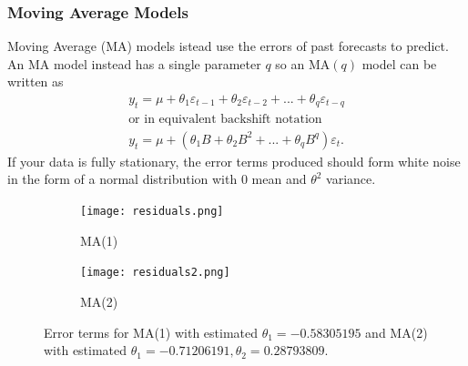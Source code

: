 \documentclass{article}
\begin{document}
  \subsubsection{Moving Average Models}
    Moving Average (MA) models istead use the errors of past forecasts to predict. An MA model instead has a single parameter $q$ so an MA$(q)$ model can be written as
    \begin{gather*}
      y_t = \mu + \theta_1 \varepsilon_{t-1} + \theta_2 \varepsilon_{t-2} + ... + \theta_q \varepsilon_{t-q}\\
      \text{or in equivalent backshift notation}\\
      y_t = \mu + (\theta_1B + \theta_2B^2 + ... + \theta_qB^q)\varepsilon_t.
    \end{gather*}
    If your data is fully stationary, the error terms produced should form white noise in the form of a normal distribution with $0$ mean and $\theta^2$ variance.

    \begin{figure}[H]
      \centering
      \captionsetup{justification=centering}
      \begin{subfigure}[b]{0.49\linewidth}
        \texttt{[image: residuals.png]}
        \caption{MA(1)}
      \end{subfigure}
      \begin{subfigure}[b]{0.49\linewidth}
        \texttt{[image: residuals2.png]}
        \caption{MA(2)}
      \end{subfigure}
      \caption{Error terms for MA(1) with estimated $\theta_1 = -0.58305195$ and MA(2) with estimated $\theta_1 = -0.71206191, \theta_2 =  0.28793809$.}
    \end{figure}
\end{document}

